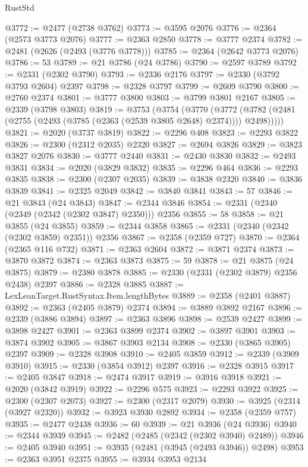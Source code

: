 \begin{lexlean}{RustStd}
\begin{coremodule}
@3772 := @2477 (@2738 @3762)
@3773 := @3595 @2076
@3776 := @2364 (@2573 @3773 @2076)
@3777 := @2363 @2850
@3778 := @3777 @2374
@3782 := @2481 (@2626 (@2493 (@3776 @3778)))
@3785 := @2364 (@2642 @3773 @2076)
@3786 := 53
@3789 := @21 @3786 (@24 @3786)
@3790 := @2597 @3789
@3792 := @2331 (@2302 @3790)
@3793 := @2336 @2176
@3797 := @2330 (@3792 @3793 @2604) @2397
@3798 := @2328 @3797
@3799 := @2609 @3790
@3800 := @2760 @2374
@3801 := @3777 @3800
@3803 := @3799 @3801 @2167
@3805 := @2339 (@3798 @3803)
@3819 := @3753
    (@3754
      (@3770
        (@3772 (@3782 (@2481 (@2755 (@2493 (@3785 (@2363 (@2539 @3805 @2648) @2374)))) @2498)))))
@3821 := @2020 (@3737 @3819)
@3822 := @2296 @408
@3823 := @2293 @3822
@3826 := @2300 (@2312 @2035) @2320
@3827 := @2694 @3826
@3829 := @3823 @3827 @2076
@3830 := @3777 @2440
@3831 := @2430 @3830
@3832 := @2493 @3831
@3834 := @2020 (@3829 @3832)
@3835 := @2296 @464
@3836 := @2293 @3835
@3838 := @2300 (@2307 @2035)
@3839 := @3838 @2320
@3840 := @3836 @3839
@3841 := @2325 @2049
@3842 := @3840 @3841
@3843 := 57
@3846 := @21 @3843 (@24 @3843)
@3847 := @2344 @3846
@3854 := @2331 (@2340 (@2349 (@2342 (@2302 @3847) @2350))) @2356
@3855 := 58
@3858 := @21 @3855 (@24 @3855)
@3859 := @2344 @3858
@3865 := @2331 (@2340 (@2342 (@2302 @3859) @2351)) @2356
@3867 := @2358 (@2359 @727)
@3870 := @2364 (@2365 @116 @732)
@3871 := @2363 @2604
@3872 := @3871 @2374
@3873 := @3870 @3872
@3874 := @2363 @3873
@3875 := 59
@3878 := @21 @3875 (@24 @3875)
@3879 := @2380 @3878
@3885 := @2330 (@2331 (@2302 @3879) @2356 @2438) @2397
@3886 := @2328 @3885
@3887 := LexLeanTarget.RustSyntax.Item.lengthBytes
@3889 := @2358 (@2401 @3887)
@3892 := @2363 (@2405 @3879) @2374
@3894 := @3889 @3892 @2167
@3896 := @2339 (@3886 @3894)
@3897 := @2363 @3896
@3898 := @2539 @2427
@3899 := @3898 @2427
@3901 := @2363 @3899 @2374
@3902 := @3897 @3901
@3903 := @3874 @3902
@3905 := @3867 @3903 @2134
@3908 := @2330 (@3865 @3905) @2397
@3909 := @2328 @3908
@3910 := @2405 @3859
@3912 := @2339 (@3909 @3910)
@3915 := @2330 (@3854 @3912) @2397
@3916 := @2328 @3915
@3917 := @2405 @3847
@3918 := @2474 @3917
@3919 := @3916 @3918
@3921 := @2020 (@3842 @3919)
@3922 := @2296 @575
@3923 := @2293 @3922
@3925 := @2300 (@2307 @2073)
@3927 := @2300 (@2317 @2079)
@3930 := @3925 (@2314 (@3927 @2320))
@3932 := @3923 @3930 @2892
@3934 := @2358 (@2359 @757)
@3935 := @2477 @2438
@3936 := 60
@3939 := @21 @3936 (@24 @3936)
@3940 := @2344 @3939
@3945 := @2482 (@2485 (@2342 (@2302 @3940) @2489))
@3946 := @2405 @3940
@3951 := @3935 (@2481 (@3945 (@2493 @3946)) @2498)
@3953 := @2363 @3951 @2375
@3955 := @3934 @3953 @2134

\end{coremodule}
\end{lexlean}

